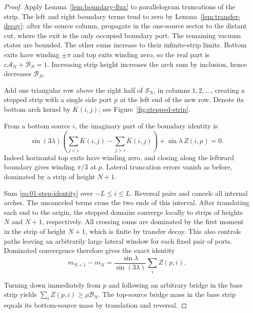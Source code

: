 \begin{proof}
Apply Lemma~\ref{lem:boundary-flux} to parallelogram truncations of the
strip. The left and right boundary terms tend to zero by
Lemma~\ref{lem:transfer-decay}: after the source column, propagate in the
one-source sector to the distant cut, where the exit is the only
occupied boundary port. The remaining vacuum states are bounded.
The other sums increase to their infinite-strip limits. Bottom exits
have winding $\pm\pi$ and top exits winding zero, so the real part is
$c\mathcal A_N+\mathcal B_N=1$. Increasing strip height increases the
arch sum by inclusion, hence decreases $\mathcal B_N$.

Add one triangular row above the right half of $\mathcal S_N$, in
columns $1,2,\ldots$, creating a stepped strip with a single side
port $p$ at the left end of the new row. Denote its bottom arch
kernel by $\overline K(i,j)$; see Figure~\ref{fig:stepped-strip}.



From a bottom source $i$, the imaginary
part of the boundary identity is
\begin{equation}\label{eq:01-step-identity}
 \sin(3\lambda)\left(
   \sum_{j<i}\overline K(i,j)-\sum_{j>i}\overline K(i,j)
 \right)+\sin\lambda\,Z(i,p)=0.
\end{equation}
Indeed horizontal top exits have winding zero, and closing along the
leftward boundary gives winding $\pi/3$ at $p$. Lateral truncation
errors vanish as before, dominated by a strip of height $N+1$.

Sum \eqref{eq:01-step-identity} over $-L\le i\le L$. Reversal pairs
and cancels all internal arches. The uncanceled terms cross the two
ends of this interval. After translating each end to the origin,
the stepped domains converge locally to strips of heights $N$ and
$N+1$, respectively. All crossing sums are dominated by the first
moment in the strip of height $N+1$, which is finite by transfer
decay. This also controls paths leaving an arbitrarily large lateral
window for each fixed pair of ports. Dominated convergence therefore
gives the exact identity
\begin{equation}\label{eq:01-step-moment}
 m_{N+1}-m_N=\frac{\sin\lambda}{\sin(3\lambda)}
                 \sum_i Z(p,i).
\end{equation}

Turning down immediately from $p$ and following an arbitrary bridge
in the base strip yields
$\sum_iZ(p,i)\ge\rho\mathcal B_N$. The top-source bridge mass in the
base strip equals its bottom-source mass by translation and reversal.


\end{proof}
